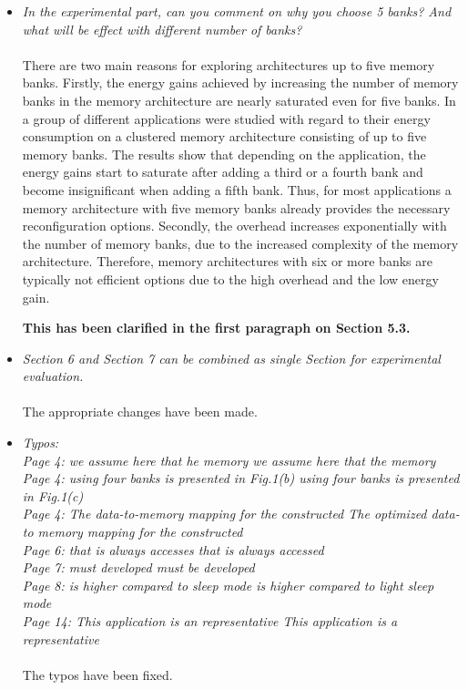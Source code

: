 \documentclass[12pt,a4paper,notitlepage]{article}
\begin{document}
\begin{itemize}
\item \textit{In the experimental part, can you comment on why you choose 5 banks? And what will be effect with different number of banks?}
\\
\\
There are two main reasons for exploring architectures up to five memory banks.
Firstly, the energy gains achieved by increasing the number of memory banks in the memory architecture are nearly saturated even for five banks.
In \cite{filippopoulos2013exploration} a group of different applications were studied with regard to their energy consumption on a clustered memory architecture consisting of up to five memory banks.
The results show that depending on the application, the energy gains start to saturate after adding a third or a fourth bank and become insignificant when adding a fifth bank.
Thus, for most applications a memory architecture with five memory banks already provides the necessary reconfiguration options.  
Secondly, the overhead increases exponentially with the number of memory banks, due to the increased complexity of the memory architecture. 
Therefore, memory architectures with six or more banks are typically not efficient options due to the high overhead and the low energy gain.

\textbf{This has been clarified in the first paragraph on Section 5.3.}

\item \textit{Section 6 and Section 7 can be combined as single Section for experimental evaluation.}
\\
\\
The appropriate changes have been made.

\item 
\textit{Typos: \\ 
Page 4: we assume here that he memory \textrightarrow we assume here that the memory\\ 
Page 4: using four banks is presented in Fig.1(b) \textrightarrow using four banks is presented in Fig.1(c) \\ 
Page 4: The data-to-memory mapping for the constructed \textrightarrow The optimized data-to memory mapping for the constructed \\ 
Page 6: that is always accesses \textrightarrow that is always accessed \\ 
Page 7: must developed \textrightarrow must be developed \\ 
Page 8: is higher compared to sleep mode \textrightarrow is higher compared to light sleep mode \\ Page 14: This application is an representative \textrightarrow This application is a representative}
\\
\\
The typos have been fixed.

\end{itemize}
\end{document}
